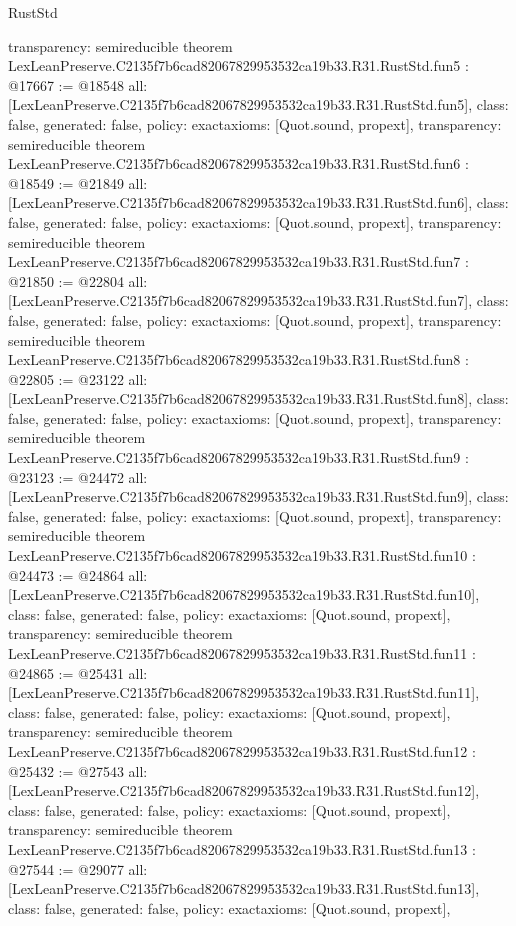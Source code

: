 \begin{lexlean}{RustStd}
\begin{coremodule}
{  transparency: semireducible
}
theorem LexLeanPreserve.C2135f7b6cad82067829953532ca19b33.R31.RustStd.fun5 : @17667 := @18548 {
  all: [LexLeanPreserve.C2135f7b6cad82067829953532ca19b33.R31.RustStd.fun5],
  class: false,
  generated: false,
  policy: exact{axioms: [Quot.sound, propext]},
  transparency: semireducible
}
theorem LexLeanPreserve.C2135f7b6cad82067829953532ca19b33.R31.RustStd.fun6 : @18549 := @21849 {
  all: [LexLeanPreserve.C2135f7b6cad82067829953532ca19b33.R31.RustStd.fun6],
  class: false,
  generated: false,
  policy: exact{axioms: [Quot.sound, propext]},
  transparency: semireducible
}
theorem LexLeanPreserve.C2135f7b6cad82067829953532ca19b33.R31.RustStd.fun7 : @21850 := @22804 {
  all: [LexLeanPreserve.C2135f7b6cad82067829953532ca19b33.R31.RustStd.fun7],
  class: false,
  generated: false,
  policy: exact{axioms: [Quot.sound, propext]},
  transparency: semireducible
}
theorem LexLeanPreserve.C2135f7b6cad82067829953532ca19b33.R31.RustStd.fun8 : @22805 := @23122 {
  all: [LexLeanPreserve.C2135f7b6cad82067829953532ca19b33.R31.RustStd.fun8],
  class: false,
  generated: false,
  policy: exact{axioms: [Quot.sound, propext]},
  transparency: semireducible
}
theorem LexLeanPreserve.C2135f7b6cad82067829953532ca19b33.R31.RustStd.fun9 : @23123 := @24472 {
  all: [LexLeanPreserve.C2135f7b6cad82067829953532ca19b33.R31.RustStd.fun9],
  class: false,
  generated: false,
  policy: exact{axioms: [Quot.sound, propext]},
  transparency: semireducible
}
theorem LexLeanPreserve.C2135f7b6cad82067829953532ca19b33.R31.RustStd.fun10 : @24473 := @24864 {
  all: [LexLeanPreserve.C2135f7b6cad82067829953532ca19b33.R31.RustStd.fun10],
  class: false,
  generated: false,
  policy: exact{axioms: [Quot.sound, propext]},
  transparency: semireducible
}
theorem LexLeanPreserve.C2135f7b6cad82067829953532ca19b33.R31.RustStd.fun11 : @24865 := @25431 {
  all: [LexLeanPreserve.C2135f7b6cad82067829953532ca19b33.R31.RustStd.fun11],
  class: false,
  generated: false,
  policy: exact{axioms: [Quot.sound, propext]},
  transparency: semireducible
}
theorem LexLeanPreserve.C2135f7b6cad82067829953532ca19b33.R31.RustStd.fun12 : @25432 := @27543 {
  all: [LexLeanPreserve.C2135f7b6cad82067829953532ca19b33.R31.RustStd.fun12],
  class: false,
  generated: false,
  policy: exact{axioms: [Quot.sound, propext]},
  transparency: semireducible
}
theorem LexLeanPreserve.C2135f7b6cad82067829953532ca19b33.R31.RustStd.fun13 : @27544 := @29077 {
  all: [LexLeanPreserve.C2135f7b6cad82067829953532ca19b33.R31.RustStd.fun13],
  class: false,
  generated: false,
  policy: exact{axioms: [Quot.sound, propext]},
}
\end{coremodule}
\end{lexlean}
